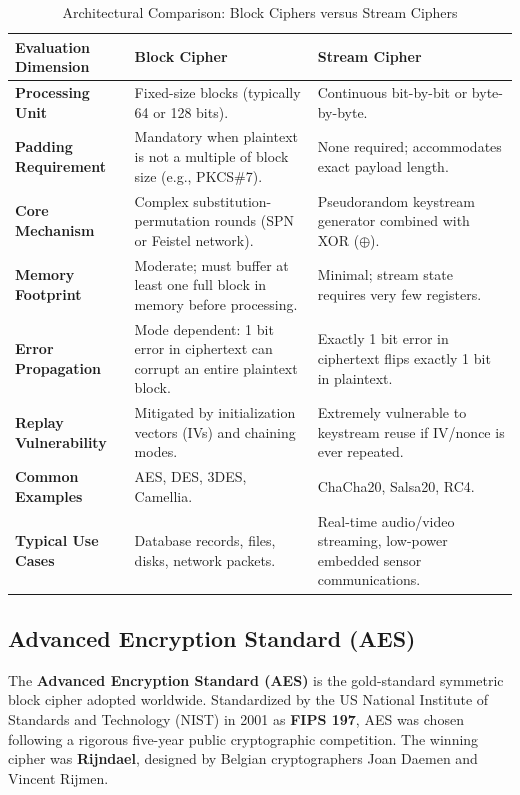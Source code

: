 \begin{table}[htbp]
\centering
\caption{Architectural Comparison: Block Ciphers versus Stream Ciphers}
\label{tab:block_vs_stream}
\begin{tabularx}{\textwidth}{p{3.2cm} X X}
\toprule
\textbf{Evaluation Dimension} & \textbf{Block Cipher} & \textbf{Stream Cipher} \\
\midrule
\textbf{Processing Unit} & Fixed-size blocks (typically 64 or 128 bits). & Continuous bit-by-bit or byte-by-byte. \\
\textbf{Padding Requirement} & Mandatory when plaintext is not a multiple of block size (e.g., PKCS\#7). & None required; accommodates exact payload length. \\
\textbf{Core Mechanism} & Complex substitution-permutation rounds (SPN or Feistel network). & Pseudorandom keystream generator combined with XOR ($\oplus$). \\
\textbf{Memory Footprint} & Moderate; must buffer at least one full block in memory before processing. & Minimal; stream state requires very few registers. \\
\textbf{Error Propagation} & Mode dependent: 1 bit error in ciphertext can corrupt an entire plaintext block. & Exactly 1 bit error in ciphertext flips exactly 1 bit in plaintext. \\
\textbf{Replay Vulnerability} & Mitigated by initialization vectors (IVs) and chaining modes. & Extremely vulnerable to keystream reuse if IV/nonce is ever repeated. \\
\textbf{Common Examples} & AES, DES, 3DES, Camellia. & ChaCha20, Salsa20, RC4. \\
\textbf{Typical Use Cases} & Database records, files, disks, network packets. & Real-time audio/video streaming, low-power embedded sensor communications. \\
\bottomrule
\end{tabularx}
\end{table}

\subsection{Advanced Encryption Standard (AES)}

The \textbf{Advanced Encryption Standard (AES)} is the gold-standard symmetric block cipher adopted worldwide. Standardized by the US National Institute of Standards and Technology (NIST) in 2001 as \textbf{FIPS 197}, AES was chosen following a rigorous five-year public cryptographic competition. The winning cipher was \textbf{Rijndael}, designed by Belgian cryptographers Joan Daemen and Vincent Rijmen.

